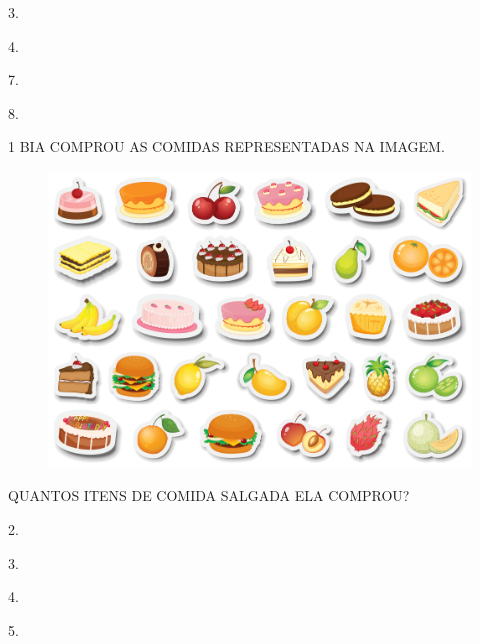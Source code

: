 \begin{escolha}
\item 3.

\item 4.

\item 7.

\item 8.
\end{escolha}


\pagebreak


\num{1} BIA COMPROU AS COMIDAS REPRESENTADAS
NA IMAGEM.

\begin{figure}[H]
\centering
\includegraphics[width=\textwidth]{./media/SAEB_1ANO_MAT_FIGURA136.png}
\end{figure}

QUANTOS ITENS DE COMIDA SALGADA ELA COMPROU?

\begin{multicols}{4}
\begin{escolha}[itemsep=0pt]
\item 2.

\item 3.

\item 4.

\item 5.
\end{escolha}
\end{multicols}

